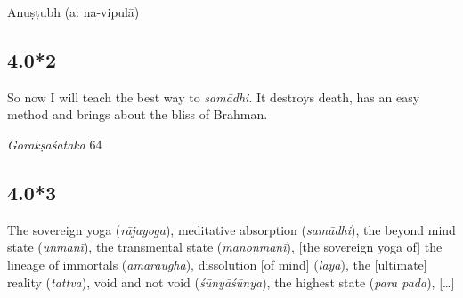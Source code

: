 \begin{ekdosis}
\begin{metre}[hp04_000_1]
Anuṣṭubh (a: na-vipulā)
\end{metre}

\subsection*{4.0*2}
\begin{translation}[hp04_000_2]
So now I will teach the best way to \emph{samādhi}. It destroys death, has an easy method and brings about the bliss of Brahman.
\end{translation}

\begin{sources}[hp04_000_2]
\emph{Gorakṣaśataka} 64
\begin{versinnote}
\tl{\var{64c tu sukhopāyair ] T; sukhadopāyaṃ GU}\\!}
\end{versinnote}
\end{sources}



\subsection*{4.0*3}
\begin{translation}[hp04_000_3]
The sovereign yoga (\emph{rājayoga}), meditative absorption (\emph{samādhi}), the beyond mind state (\emph{unmanī}), the transmental state (\textit{manonmanī}), [the sovereign yoga of] the lineage of immortals (\emph{amaraugha}), dissolution [of mind] (\emph{laya}), the [ultimate] reality (\emph{tattva}), void and not void (\textit{śūnyāśūnya}), the highest state (\emph{para pada}), [\dots]
\end{translation}


\end{ekdosis}
